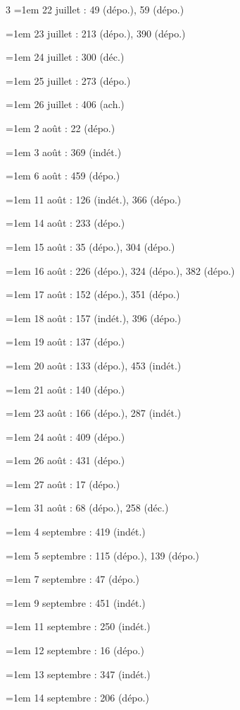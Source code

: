 \begin{multicols}{3}
\hangindent=1em 22 juillet : 49 (dépo.), 59 (dépo.)\par
\hangindent=1em 23 juillet : 213 (dépo.), 390 (dépo.)\par
\hangindent=1em 24 juillet : 300 (déc.)\par
\hangindent=1em 25 juillet : 273 (dépo.)\par
\hangindent=1em 26 juillet : 406 (ach.)\par
\hangindent=1em 2 août : 22 (dépo.)\par
\hangindent=1em 3 août : 369 (indét.)\par
\hangindent=1em 6 août : 459 (dépo.)\par
\hangindent=1em 11 août : 126 (indét.), 366 (dépo.)\par
\hangindent=1em 14 août : 233 (dépo.)\par
\hangindent=1em 15 août : 35 (dépo.), 304 (dépo.)\par
\hangindent=1em 16 août : 226 (dépo.), 324 (dépo.), 382 (dépo.)\par
\hangindent=1em 17 août : 152 (dépo.), 351 (dépo.)\par
\hangindent=1em 18 août : 157 (indét.), 396 (dépo.)\par
\hangindent=1em 19 août : 137 (dépo.)\par
\hangindent=1em 20 août : 133 (dépo.), 453 (indét.)\par
\hangindent=1em 21 août : 140 (dépo.)\par
\hangindent=1em 23 août : 166 (dépo.), 287 (indét.)\par
\hangindent=1em 24 août : 409 (dépo.)\par
\hangindent=1em 26 août : 431 (dépo.)\par
\hangindent=1em 27 août : 17 (dépo.)\par
\hangindent=1em 31 août : 68 (dépo.), 258 (déc.)\par
\hangindent=1em 4 septembre : 419 (indét.)\par
\hangindent=1em 5 septembre : 115 (dépo.), 139 (dépo.)\par
\hangindent=1em 7 septembre : 47 (dépo.)\par
\hangindent=1em 9 septembre : 451 (indét.)\par
\hangindent=1em 11 septembre : 250 (indét.)\par
\hangindent=1em 12 septembre : 16 (dépo.)\par
\hangindent=1em 13 septembre : 347 (indét.)\par
\hangindent=1em 14 septembre : 206 (dépo.)\par

\end{multicols}
